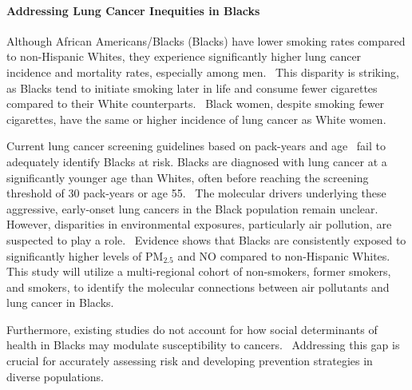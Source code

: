 \paragraph{Addressing Lung Cancer Inequities in Blacks}
Although African Americans/Blacks (Blacks) have lower smoking rates compared to non-Hispanic Whites, 
they experience significantly higher lung cancer incidence and mortality rates, especially among men.~\cite{belony_abstract_2022,thaiparambil_abstract_2023,valencia_interrogating_2022} 
This disparity is striking, as Blacks tend to initiate smoking later in life and consume fewer cigarettes compared to their White counterparts.~\cite{thaiparambil_abstract_2023,hede_drilling_2010} 
Black women, despite smoking fewer cigarettes, have the same or higher incidence of lung cancer as White women. %

Current lung cancer screening guidelines based on pack-years and age~\cite{landy_absolute_2024} fail to adequately identify Blacks at risk.
Blacks are diagnosed with lung cancer at a significantly younger age than Whites, often before reaching the screening threshold of 30 pack-years or age 55.~\cite{meza_evaluation_2021} 
The molecular drivers underlying these aggressive, early-onset lung cancers in the Black population remain unclear.
However, disparities in environmental exposures, particularly air pollution, are suspected to play a role.~\cite{marcinkiewicz_impact_2023}
Evidence shows that Blacks are consistently exposed to significantly higher levels of PM$_{2.5}$ and NO compared to non-Hispanic Whites. %
This study will utilize a multi-regional cohort of non-smokers, former smokers, and smokers,
to identify the molecular connections between air pollutants and lung cancer in Blacks.

Furthermore, existing studies do not account for how social determinants of health in Blacks may modulate susceptibility to cancers.~\cite{valencia_interrogating_2022} 
Addressing this gap is crucial for accurately assessing risk and developing prevention strategies in diverse populations.

